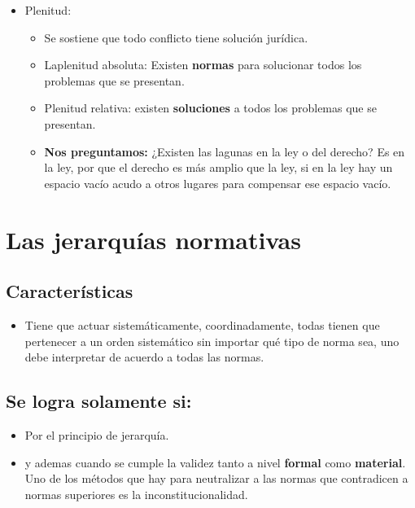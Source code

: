 \begin{enumerate}
\begin{itemize}
        \item Plenitud:
            \begin{itemize}
                \item Se sostiene que todo conflicto tiene solución jurídica.
                \item Laplenitud absoluta: Existen \textbf{normas} para solucionar todos los problemas que se presentan.
                \item Plenitud relativa: existen \textbf{soluciones} a todos los problemas que se presentan.
                \item \textbf{Nos preguntamos:} ¿Existen las lagunas en la ley o del derecho? Es en la ley, por que el derecho es más amplio que la ley, si en la ley hay un espacio vacío acudo a otros lugares para compensar ese espacio vacío.
            \end{itemize}
    \end{itemize}
\end{enumerate}

\section{Las jerarquías normativas}
\subsection{Características}
\begin{itemize}
    \item Tiene que actuar sistemáticamente, coordinadamente, todas tienen que pertenecer a un orden sistemático sin importar qué tipo de norma sea, uno debe interpretar de acuerdo a todas las normas.
\end{itemize}
\subsection{Se logra solamente si: }
\begin{itemize}
    \item Por el principio de jerarquía.
    \item y ademas cuando se cumple la validez tanto a nivel \textbf{formal} como \textbf{material}. Uno de los métodos que hay para neutralizar a las normas que contradicen a normas superiores es la inconstitucionalidad.
\end{itemize}
